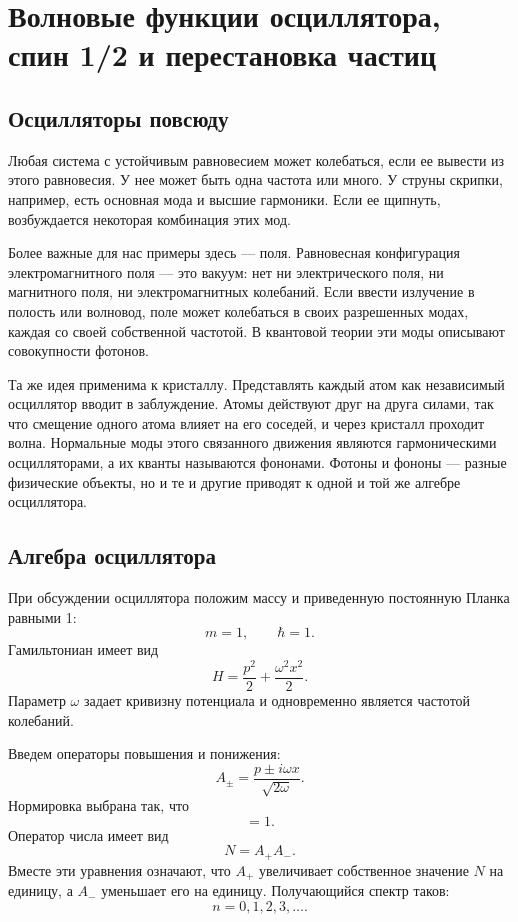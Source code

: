 \chapter{Волновые функции осциллятора, спин 1/2 и перестановка частиц}

\section{Осцилляторы повсюду}

Любая система с устойчивым равновесием может колебаться, если ее вывести из этого равновесия. У нее может быть одна частота или много. У струны скрипки, например, есть основная мода и высшие гармоники. Если ее щипнуть, возбуждается некоторая комбинация этих мод.

Более важные для нас примеры здесь — поля. Равновесная конфигурация электромагнитного поля — это вакуум: нет ни электрического поля, ни магнитного поля, ни электромагнитных колебаний. Если ввести излучение в полость или волновод, поле может колебаться в своих разрешенных модах, каждая со своей собственной частотой. В квантовой теории эти моды описывают совокупности фотонов.

Та же идея применима к кристаллу. Представлять каждый атом как независимый осциллятор вводит в заблуждение. Атомы действуют друг на друга силами, так что смещение одного атома влияет на его соседей, и через кристалл проходит волна. Нормальные моды этого связанного движения являются гармоническими осцилляторами, а их кванты называются фононами. Фотоны и фононы — разные физические объекты, но и те и другие приводят к одной и той же алгебре осциллятора.

\section{Алгебра осциллятора}

При обсуждении осциллятора положим массу и приведенную постоянную Планка равными 1:
\[
m=1,\qquad \hbar=1.
\]
Гамильтониан имеет вид
\begin{equation}
H=\frac{p^{2}}{2}+\frac{\omega^{2}x^{2}}{2}.
\end{equation}
Параметр \(\omega\) задает кривизну потенциала и одновременно является частотой колебаний.

Введем операторы повышения и понижения:
\begin{equation}
A_{\pm}=\frac{p\pm i\omega x}{\sqrt{2\omega}}.
\end{equation}
Нормировка выбрана так, что
\begin{equation}
[A_{-},A_{+}]=1.
\end{equation}
Оператор числа имеет вид
\begin{equation}
N=A_{+}A_{-}.
\end{equation}
Вместе эти уравнения означают, что \(A_{+}\) увеличивает собственное значение \(N\) на единицу, а \(A_{-}\) уменьшает его на единицу. Получающийся спектр таков:
\begin{equation}
n=0,1,2,3,\ldots .
\end{equation}


